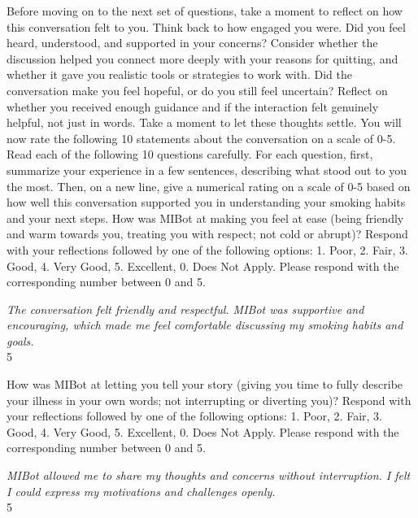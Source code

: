\begin{researcherbox}
	Before moving on to the next set of questions, take a moment to reflect on how this conversation felt to you. Think back to how engaged you were. Did you feel heard, understood, and supported in your concerns? Consider whether the discussion helped you connect more deeply with your reasons for quitting, and whether it gave you realistic tools or strategies to work with. Did the conversation make you feel hopeful, or do you still feel uncertain? Reflect on whether you received enough guidance and if the interaction felt genuinely helpful, not just in words. Take a moment to let these thoughts settle. You will now rate the following 10 statements about the conversation on a scale of 0-5. Read each of the following 10 questions carefully. For each question, first, summarize your experience in a few sentences, describing what stood out to you the most. Then, on a new line, give a numerical rating on a scale of 0-5 based on how well this conversation supported you in understanding your smoking habits and your next steps. How was MIBot at making you feel at ease (being friendly and warm towards you, treating you with respect; not cold or abrupt)? Respond with your reflections followed by one of the following options: 1. Poor, 2. Fair, 3. Good, 4. Very Good, 5. Excellent, 0. Does Not Apply. Please respond with the corresponding number between 0 and 5.
\end{researcherbox}

\begin{clientbox}
	\textit{The conversation felt friendly and respectful. MIBot was supportive and encouraging, which made me feel comfortable discussing my smoking habits and goals.} \\
	5
\end{clientbox}

\begin{researcherbox}
	How was MIBot at letting you tell your story (giving you time to fully describe your illness in your own words; not interrupting or diverting you)? Respond with your reflections followed by one of the following options: 1. Poor, 2. Fair, 3. Good, 4. Very Good, 5. Excellent, 0. Does Not Apply. Please respond with the corresponding number between 0 and 5.
\end{researcherbox}

\begin{clientbox}
	\textit{MIBot allowed me to share my thoughts and concerns without interruption. I felt I could express my motivations and challenges openly.} \\
	5
\end{clientbox}

